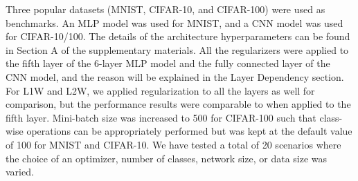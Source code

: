 \begin{table}[t]
\centering
\caption{Error performance (\%) for CIFAR-100 CNN model.}
\label{table:cifar-100}
\end{table}

Three popular datasets (MNIST, CIFAR-10, and CIFAR-100) were used as benchmarks. An MLP model was used for MNIST, and a CNN model was used for CIFAR-10/100. The details of the architecture hyperparameters can be found in Section A of the supplementary materials. All the regularizers were applied to the fifth layer of the 6-layer MLP model and the fully connected layer of the CNN model, and the reason will be explained in the Layer Dependency section. For L1W and L2W, we applied regularization to all the layers as well for comparison, but the performance results were comparable to when applied to the fifth layer. Mini-batch size was increased to 500 for CIFAR-100 such that class-wise operations can be appropriately performed but was kept at the default value of 100 for MNIST and CIFAR-10. We have tested a total of 20 scenarios where the choice of an optimizer, number of classes, network size, or data size was varied.

